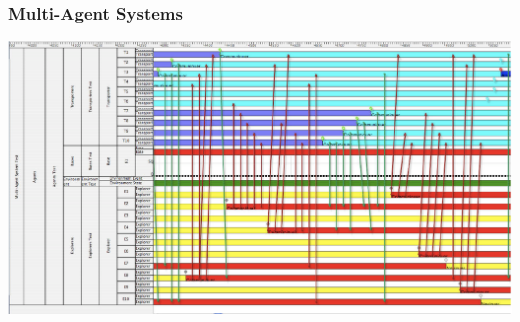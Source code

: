 \begin{frame}
\frametitle{Multi-Agent Systems}

\includegraphics[width=\textwidth]{figures/SMA.pdf}

\end{frame}
%
%


%
%


